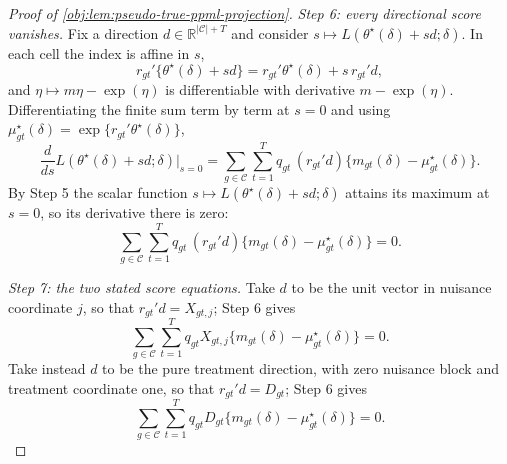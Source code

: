 \begin{proof}[Proof of \cref{obj:lem:pseudo-true-ppml-projection}]
\textit{Step 6: every directional score vanishes.} Fix a direction \(d\in\mathbb R^{|\mathcal C|+T}\) and consider \(s\mapsto L(\theta^\star(\delta)+sd;\delta)\). In each cell the index is affine in \(s\),
\[
r_{gt}'\{\theta^\star(\delta)+sd\}=r_{gt}'\theta^\star(\delta)+s\,r_{gt}'d ,
\]
and \(\eta\mapsto m\eta-\exp(\eta)\) is differentiable with derivative \(m-\exp(\eta)\). Differentiating the finite sum term by term at \(s=0\) and using \(\mu^\star_{gt}(\delta)=\exp\{r_{gt}'\theta^\star(\delta)\}\),
\[
\frac{d}{ds}L(\theta^\star(\delta)+sd;\delta)\Big|_{s=0}
=
\sum_{g\in\mathcal C}\sum_{t=1}^T
q_{gt}\,(r_{gt}'d)\{m_{gt}(\delta)-\mu^\star_{gt}(\delta)\}.
\]
By Step 5 the scalar function \(s\mapsto L(\theta^\star(\delta)+sd;\delta)\) attains its maximum at \(s=0\), so its derivative there is zero:
\[
\sum_{g\in\mathcal C}\sum_{t=1}^T
q_{gt}\,(r_{gt}'d)\{m_{gt}(\delta)-\mu^\star_{gt}(\delta)\}=0 .
\]

\textit{Step 7: the two stated score equations.} Take \(d\) to be the unit vector in nuisance coordinate \(j\), so that \(r_{gt}'d=X_{gt,j}\); Step 6 gives
\[
\sum_{g\in\mathcal C}\sum_{t=1}^T
q_{gt}X_{gt,j}\{m_{gt}(\delta)-\mu^\star_{gt}(\delta)\}=0 .
\]
Take instead \(d\) to be the pure treatment direction, with zero nuisance block and treatment coordinate one, so that \(r_{gt}'d=D_{gt}\); Step 6 gives
\[
\sum_{g\in\mathcal C}\sum_{t=1}^T
q_{gt}D_{gt}\{m_{gt}(\delta)-\mu^\star_{gt}(\delta)\}=0 .
\]
\end{proof}
